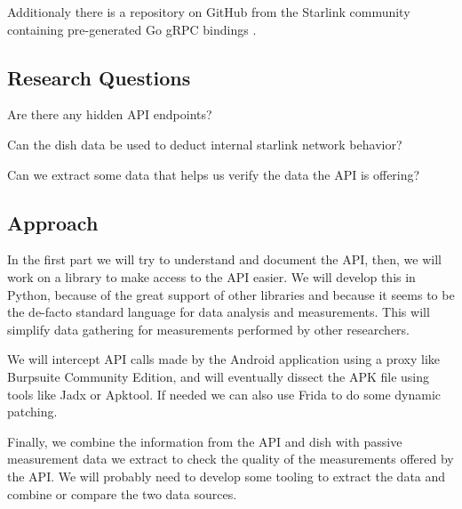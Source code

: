 \documentclass[NET,a4paper,12pt,english]{netforms}
\begin{document}
Additionaly there is a repository on GitHub from the Starlink community containing pre-generated Go gRPC bindings \cite{starlink-grpc-go}.

\subsection*{Research Questions}
\begin{researchquestions}
\item Are there any hidden API endpoints?
\item Can the dish data be used to deduct internal starlink network behavior?
\item Can we extract some data that helps us verify the data the API is offering?
\end{researchquestions}

\subsection*{Approach}
In the first part we will try to understand and document the API, then, we will work on a library to make access to the API easier.
We will develop this in Python, because of the great support of other libraries and because it seems to be the de-facto standard language
for data analysis and measurements. This will simplify data gathering for measurements performed by other researchers.

We will intercept API calls made by the Android application using a proxy like Burpsuite Community Edition, and will eventually dissect the APK file
using tools like Jadx or Apktool. If needed we can also use Frida to do some dynamic patching.

Finally, we combine the information from the API and dish with passive measurement data we extract to check the quality of the measurements offered by the API.
We will probably need to develop some tooling to extract the data and combine or compare the two data sources.
\end{document}
